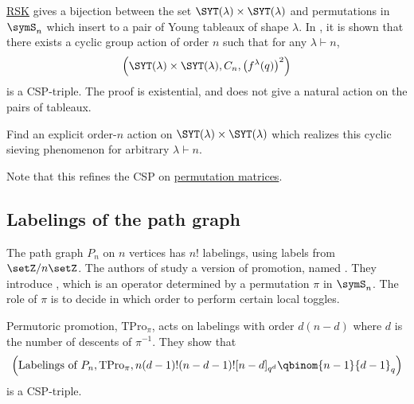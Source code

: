 \hyperref[rsk]{RSK} gives a bijection between
the set $\SYT(\lambda) \times \SYT(\lambda)$ and permutations
in $\symS_n$ which insert to a pair of Young tableaux of shape $\lambda$.
In \cite[Thm.~44]{AlexanderssonPfannererRubeyUhlin2020}, it is shown that
there exists a cyclic group action of order $n$ such that
for any $\lambda \vdash n$,
\[
 \left( \SYT(\lambda) \times \SYT(\lambda), C_n, \left(f^{\lambda}(q)\right)^2 \right)
\]
is a CSP-triple.  The proof is existential, and does not give a natural action
on the pairs of tableaux.

\begin{problem}
Find an explicit order-$n$ action on
$\SYT(\lambda) \times \SYT(\lambda)$ which realizes this cyclic sieving
phenomenon for arbitrary $\lambda \vdash n$.
\end{problem}

Note that this refines the CSP on \hyperref[cspPermutations2]{permutation matrices}.


\subsection[cspPathGraphLabelings]{Labelings of the path graph}

The path graph $P_n$ on $n$ vertices has $n!$ labelings, using labels from
$\setZ/n\setZ$.
The authors of \cite{DefantMadhukaraThomas2023x} study a version of promotion,
named \label{pathGraphToricPromotion}.
They introduce \label{permutoricPromotion}, which
is an operator determined by a permutation $\pi$ in $\symS_n$.
The role of $\pi$ is to decide in which order to perform certain local toggles.

Permutoric promotion, $\mathrm{TPro}_{\pi}$,
acts on labelings with order $d(n-d)$ where $d$ is the number of descents of $\pi^{-1}$.
They show that
\[
 \left(
 \text{Labelings of $P_n$},
 \mathrm{TPro}_{\pi},
 n(d-1)!(n-d-1)! [n-d]_{q^d} \qbinom{n-1}{d-1}_q
 \right)
\]
is a CSP-triple.
